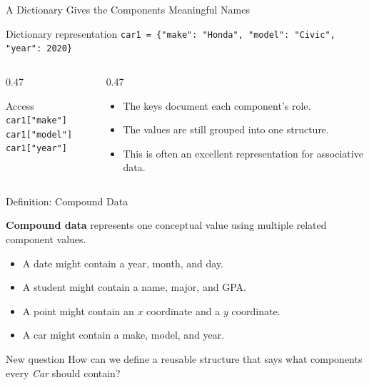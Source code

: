 \documentclass[aspectratio=169,10pt]{beamer}
\begin{document}
\begin{frame}{A Dictionary Gives the Components Meaningful Names}
  \begin{block}{Dictionary representation}
    \texttt{car1 = \{"make": "Honda", "model": "Civic", "year": 2020\}}
  \end{block}

  \begin{columns}[T,onlytextwidth]
    \begin{column}{0.47\textwidth}
      \begin{block}{Access}
        \texttt{car1["make"]}\\
        \texttt{car1["model"]}\\
        \texttt{car1["year"]}
      \end{block}
    \end{column}
    \begin{column}{0.47\textwidth}
      \begin{itemize}
        \item The keys document each component's role.
        \item The values are still grouped into one structure.
        \item This is often an excellent representation for associative data.
      \end{itemize}
    \end{column}
  \end{columns}
\end{frame}

\begin{frame}{Definition: Compound Data}
  \begin{cpdefinition}
    \textbf{Compound data} represents one conceptual value using multiple related component values.
  \end{cpdefinition}

  \begin{itemize}
    \item A date might contain a year, month, and day.
    \item A student might contain a name, major, and GPA.
    \item A point might contain an $x$ coordinate and a $y$ coordinate.
    \item A car might contain a make, model, and year.
  \end{itemize}

  \begin{block}{New question}
    How can we define a reusable structure that says what components every \emph{Car} should contain?
  \end{block}
\end{frame}
\end{document}
